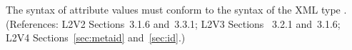 The syntax of  attribute values must conform to the syntax of the
XML type .  (References: L2V2 Sections~3.1.6 and~3.3.1;
L2V3 Sections ~3.2.1 and~3.1.6; L2V4 Sections~\ref{sec:metaid} and~\ref{sec:id}.)
